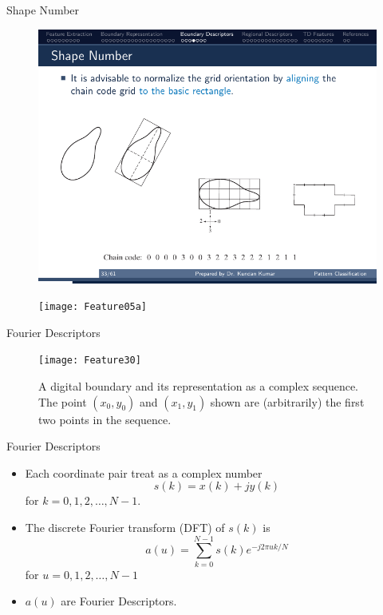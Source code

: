 \begin{frame}{Shape Number}
\begin{figure}
\includegraphics[scale=1]{Figures/Feature05f}
\end{figure}
\begin{figure}
\texttt{[image: Feature05a]}
\end{figure}
\end{frame}

\begin{frame}{Fourier Descriptors}
\begin{figure}
\texttt{[image: Feature30]}
\caption{A digital boundary and its representation as a complex sequence. The point $(x_0,y_0)$ and $(x_1,y_1)$ shown are (arbitrarily) the first two points in the sequence.}
\end{figure}
\end{frame}

\begin{frame}{Fourier Descriptors}
\begin{itemize}
\item Each coordinate pair treat as a complex number
\[\boxed{s(k)=x(k)+jy(k)}\]
for $k=0,1,2,\ldots, N-1$.
\item The discrete Fourier transform (DFT) of $s(k)$ is
\[\boxed{a(u) = \sum\limits_{k = 0}^{N - 1} {s(k){e^{ - j2\pi uk/N}}} }\]
for $u=0,1,2,\ldots,N-1$
\item $a(u)$ are Fourier Descriptors.
\end{itemize}
\end{frame}

